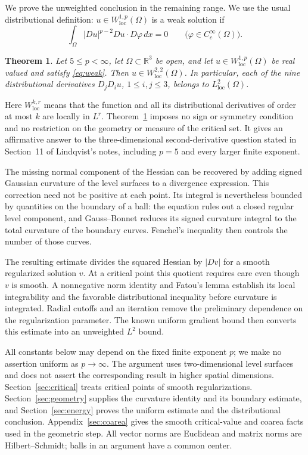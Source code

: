 \documentclass[11pt]{article}
\newtheorem{theorem}{Theorem}[section]
\theoremstyle{remark}
\newcommand{\R}{\mathbb R}
\newcommand{\loc}{\mathrm{loc}}
\newcommand{\dd}{\,dx}
\begin{document}
We prove the unweighted conclusion in the remaining range. We use
the usual distributional definition: $u\in W^{1,p}_{\loc}(\Omega)$ is
a weak solution if
\begin{equation}\label{eq:weak}
 \int_\Omega |Du|^{p-2}Du\cdot D\varphi\dd=0
 \qquad\bigl(\varphi\in C_c^\infty(\Omega)\bigr).
\end{equation}

\begin{theorem}\label{thm:main}
Let $5\leq p<\infty$, let $\Omega\subset\R^3$ be open, and let
$u\in W^{1,p}_{\loc}(\Omega)$ be real valued and satisfy
\eqref{eq:weak}. Then $u\in W^{2,2}_{\loc}(\Omega)$.
In particular, each of the nine distributional derivatives
$D_jD_i u$, $1\leq i,j\leq3$, belongs to $L^2_{\loc}(\Omega)$.
\end{theorem}

Here $W^{k,r}_{\loc}$ means that the function and all its
distributional derivatives of order at most $k$ are locally in $L^r$.
Theorem~\ref{thm:main} imposes no sign or symmetry condition and no
restriction on the geometry or measure of the critical set.
It gives an affirmative answer to the three-dimensional
second-derivative question stated in Section~11 of Lindqvist's notes, including
$p=5$ and every larger finite exponent.

The missing normal component of the Hessian can be recovered by
adding signed Gaussian curvature of the level surfaces to a
divergence expression. This correction need not be positive at
each point. Its integral is nevertheless bounded by quantities on
the boundary of a ball: the equation rules out a closed regular
level component, and Gauss--Bonnet reduces its signed curvature
integral to the total curvature of the boundary curves. Fenchel's
inequality then controls the number of those curves.

The resulting estimate divides the squared Hessian by $|Dv|$ for
a smooth regularized solution $v$. At a critical point this
quotient requires care even though $v$ is smooth. A nonnegative
norm identity and Fatou's lemma establish its local integrability
and the favorable distributional inequality before curvature is
integrated. Radial cutoffs and an iteration remove the preliminary
dependence on the regularization parameter. The known uniform
gradient bound then converts this estimate into an unweighted
$L^2$ bound.

All constants below may depend on the fixed finite exponent $p$;
we make no assertion uniform as $p\to\infty$. The argument uses
two-dimensional level surfaces and does not assert the corresponding
result in higher spatial dimensions.
Section~\ref{sec:critical} treats critical points of smooth
regularizations. Section~\ref{sec:geometry} supplies the curvature
identity and its boundary estimate, and
Section~\ref{sec:energy} proves the uniform estimate and the
distributional conclusion. Appendix~\ref{sec:coarea} gives the
smooth critical-value and coarea facts used in the geometric step.
All vector norms are Euclidean and matrix norms are Hilbert--Schmidt;
balls in an argument have a common center.
\end{document}
